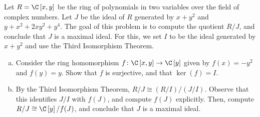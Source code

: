 \documentclass[10pt]{mypackage}
\begin{document}
\begin{problem}[Problem 6]
  Let $R = \C\left[ x,y \right]$ be the ring of polynomials in two variables over the field of complex numbers. Let $J$ be the ideal of $R$ generated by $x +y^2$ and $y + x^2 + 2xy^2 + y^{4}$. The goal of this problem is to compute the quotient $R/J$, and conclude that $J$ is a maximal ideal. For this, we set $I$ to be the ideal generated by $x + y^2$ and use the Third Isomorphism Theorem.
  \begin{enumerate}[(a)]
    \item Consider the ring homomorphism $f\colon \C\left[ x,y \right]\rightarrow \C\left[ y \right]$ given by $f(x) = -y^2$ and $f(y) = y$. Show that $f$ is surjective, and that $\ker(f) = I$.
    \item By the Third Isomorphism Theorem, $R/J\cong (R/I)/(J/I)$. Observe that this identifies $J/I$ with $f(J)$, and compute $f(J)$ explicitly. Then, compute $R/J \cong \C\left[ y \right]/f(J)$, and conclude that $J$ is a maximal ideal.
  \end{enumerate}
\end{problem}
\end{document}
